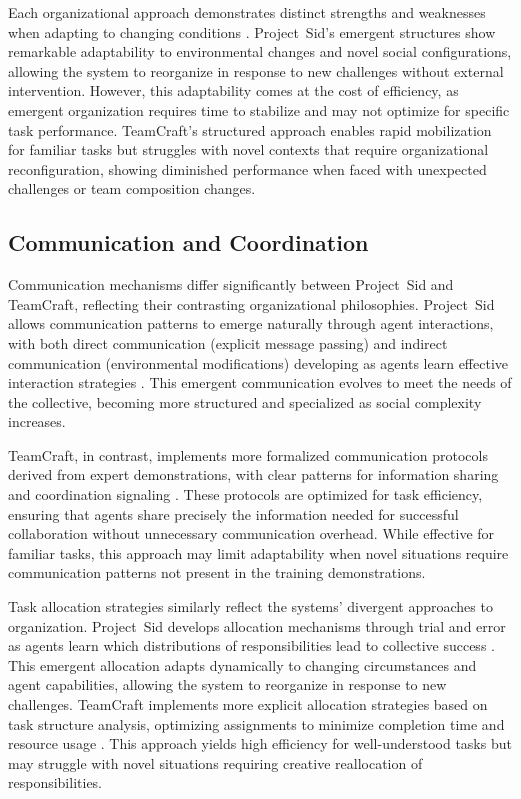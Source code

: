 \documentclass[a4paper, 12pt]{article}
\begin{document}
Each organizational approach demonstrates distinct strengths and weaknesses when adapting to changing conditions \autocite{Altera2024, Long2024, Chen2024}. Project~Sid's emergent structures show remarkable adaptability to environmental changes and novel social configurations, allowing the system to reorganize in response to new challenges without external intervention. However, this adaptability comes at the cost of efficiency, as emergent organization requires time to stabilize and may not optimize for specific task performance. TeamCraft's structured approach enables rapid mobilization for familiar tasks but struggles with novel contexts that require organizational reconfiguration, showing diminished performance when faced with unexpected challenges or team composition changes.

\subsection{Communication and Coordination}

Communication mechanisms differ significantly between Project~Sid and TeamCraft, reflecting their contrasting organizational philosophies. Project~Sid allows communication patterns to emerge naturally through agent interactions, with both direct communication (explicit message passing) and indirect communication (environmental modifications) developing as agents learn effective interaction strategies \autocite{Altera2024}. This emergent communication evolves to meet the needs of the collective, becoming more structured and specialized as social complexity increases.

TeamCraft, in contrast, implements more formalized communication protocols derived from expert demonstrations, with clear patterns for information sharing and coordination signaling \autocite{Long2024, Qiu2024}. These protocols are optimized for task efficiency, ensuring that agents share precisely the information needed for successful collaboration without unnecessary communication overhead. While effective for familiar tasks, this approach may limit adaptability when novel situations require communication patterns not present in the training demonstrations.

Task allocation strategies similarly reflect the systems' divergent approaches to organization. Project~Sid develops allocation mechanisms through trial and error as agents learn which distributions of responsibilities lead to collective success \autocite{Altera2024}. This emergent allocation adapts dynamically to changing circumstances and agent capabilities, allowing the system to reorganize in response to new challenges. TeamCraft implements more explicit allocation strategies based on task structure analysis, optimizing assignments to minimize completion time and resource usage \autocite{Long2024, Dong2024}. This approach yields high efficiency for well-understood tasks but may struggle with novel situations requiring creative reallocation of responsibilities.
\end{document}
